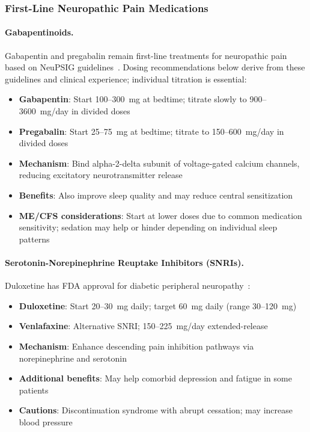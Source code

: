 \subsubsection{First-Line Neuropathic Pain Medications}

\paragraph{Gabapentinoids.}
Gabapentin and pregabalin remain first-line treatments for neuropathic pain based on NeuPSIG guidelines~\cite{Finnerup2015neuropathic}. Dosing recommendations below derive from these guidelines and clinical experience; individual titration is essential:

\begin{itemize}
    \item \textbf{Gabapentin}: Start 100--300~mg at bedtime; titrate slowly to 900--3600~mg/day in divided doses
    \item \textbf{Pregabalin}: Start 25--75~mg at bedtime; titrate to 150--600~mg/day in divided doses
    \item \textbf{Mechanism}: Bind alpha-2-delta subunit of voltage-gated calcium channels, reducing excitatory neurotransmitter release
    \item \textbf{Benefits}: Also improve sleep quality and may reduce central sensitization
    \item \textbf{ME/CFS considerations}: Start at lower doses due to common medication sensitivity; sedation may help or hinder depending on individual sleep patterns
\end{itemize}

\paragraph{Serotonin-Norepinephrine Reuptake Inhibitors (SNRIs).}
Duloxetine has FDA approval for diabetic peripheral neuropathy~\cite{Finnerup2015neuropathic}:

\begin{itemize}
    \item \textbf{Duloxetine}: Start 20--30~mg daily; target 60~mg daily (range 30--120~mg)
    \item \textbf{Venlafaxine}: Alternative SNRI; 150--225~mg/day extended-release
    \item \textbf{Mechanism}: Enhance descending pain inhibition pathways via norepinephrine and serotonin
    \item \textbf{Additional benefits}: May help comorbid depression and fatigue in some patients
    \item \textbf{Cautions}: Discontinuation syndrome with abrupt cessation; may increase blood pressure
\end{itemize}

